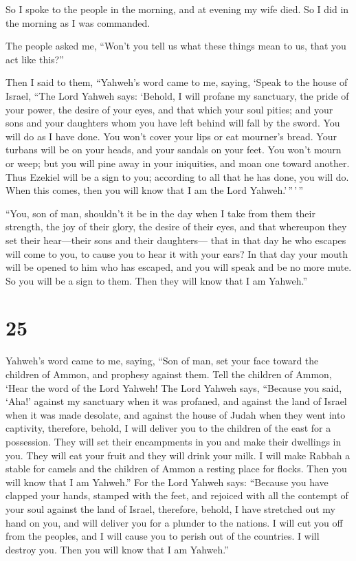  So I spoke to the people in the morning, and at evening my
wife died. So I did in the morning as I was commanded.

 The people asked me, ``Won't you tell us what these things
mean to us, that you act like this?''

 Then I said to them, ``Yahweh's word came to me, saying,
 `Speak to the house of Israel, ``The Lord Yahweh says:
`Behold, I will profane my sanctuary, the pride of your power, the
desire of your eyes, and that which your soul pities; and your sons and
your daughters whom you have left behind will fall by the sword.
 You will do as I have done. You won't cover your lips or
eat mourner's bread.  Your turbans will be on your heads,
and your sandals on your feet. You won't mourn or weep; but you will
pine away in your iniquities, and moan one toward another. 
Thus Ezekiel will be a sign to you; according to all that he has done,
you will do. When this comes, then you will know that I am the Lord
Yahweh.'\,''\,'\,''

 ``You, son of man, shouldn't it be in the day when I take
from them their strength, the joy of their glory, the desire of their
eyes, and that whereupon they set their hear---their sons and their
daughters---  that in that day he who escapes will come to
you, to cause you to hear it with your ears?  In that day
your mouth will be opened to him who has escaped, and you will speak and
be no more mute. So you will be a sign to them. Then they will know that
I am Yahweh.''

\hypertarget{section-23}{%
\section{25}\label{section-23}}

 Yahweh's word came to me, saying,  ``Son of
man, set your face toward the children of Ammon, and prophesy against
them.  Tell the children of Ammon, `Hear the word of the
Lord Yahweh! The Lord Yahweh says, ``Because you said, `Aha!' against my
sanctuary when it was profaned, and against the land of Israel when it
was made desolate, and against the house of Judah when they went into
captivity,  therefore, behold, I will deliver you to the
children of the east for a possession. They will set their encampments
in you and make their dwellings in you. They will eat your fruit and
they will drink your milk.  I will make Rabbah a stable for
camels and the children of Ammon a resting place for flocks. Then you
will know that I am Yahweh.''  For the Lord Yahweh says:
``Because you have clapped your hands, stamped with the feet, and
rejoiced with all the contempt of your soul against the land of Israel,
 therefore, behold, I have stretched out my hand on you, and
will deliver you for a plunder to the nations. I will cut you off from
the peoples, and I will cause you to perish out of the countries. I will
destroy you. Then you will know that I am Yahweh.''

